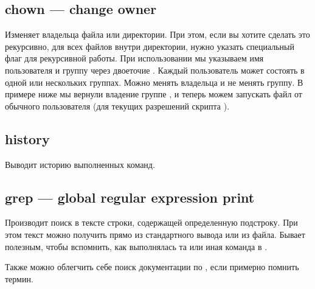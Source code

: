 \documentclass[letterpaper,10pt,russian]{sphinxmanual}
\begin{document}
\sphinxAtStartPar
{}


\subsection{chown — change owner}
\label{\detokenize{educational_materials/bash/content:chown-change-owner}}
\sphinxAtStartPar
Изменяет владельца файла или директории. При этом, если вы хотите сделать это рекурсивно, для всех файлов внутри директории, нужно указать специальный флаг  для рекурсивной работы. При использовании мы указываем имя пользователя и группу через двоеточие . Каждый пользователь может состоять в одной или нескольких группах. Можно менять владельца и не менять группу. В примере ниже мы вернули владение группе , и теперь можем запускать файл от обычного пользователя (для текущих разрешений скрипта ).

\sphinxAtStartPar
{}


\subsection{history}
\label{\detokenize{educational_materials/bash/content:history}}
\sphinxAtStartPar
Выводит историю выполненных команд.

\sphinxAtStartPar
{}


\subsection{grep — global regular expression print}
\label{\detokenize{educational_materials/bash/content:grep-global-regular-expression-print}}
\sphinxAtStartPar
Производит поиск в тексте строки, содержащей определенную подстроку. При этом текст можно получить прямо из стандартного вывода или из файла. Бывает полезным, чтобы вспомнить, как выполнялась та или иная команда в .

\sphinxAtStartPar
{}

\sphinxAtStartPar
Также можно облегчить себе поиск документации по , если примерно помнить термин.

\sphinxAtStartPar
{}
\end{document}
